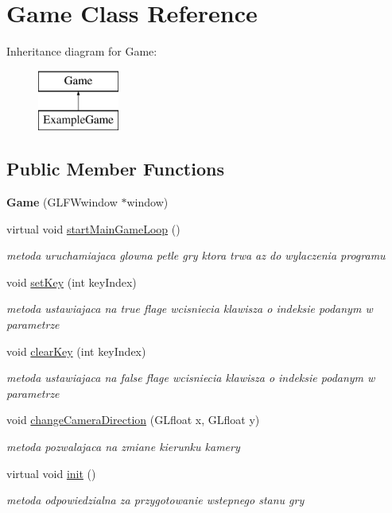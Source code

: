\hypertarget{class_game}{}\section{Game Class Reference}
\label{class_game}
Inheritance diagram for Game\+:\begin{figure}[H]
\begin{center}
\leavevmode
\includegraphics[height=2.000000cm]{class_game}
\end{center}
\end{figure}
\subsection*{Public Member Functions}
\begin{DoxyCompactItemize}
\item 
\mbox{\label{class_game_aa6ff0b765ee893dfb1aa2ad1a441b227}} 
{\bfseries Game} (G\+L\+F\+Wwindow $\ast$window)
\item 
virtual void \hyperlink{class_game_abf74d863d666bc8e1c5aa8942ba0ac18}{start\+Main\+Game\+Loop} ()
\begin{DoxyCompactList}\small\item\em metoda uruchamiajaca glowna petle gry ktora trwa az do wylaczenia programu \end{DoxyCompactList}\item 
void \hyperlink{class_game_a403da81cad9f17da729f7362768ba118}{set\+Key} (int key\+Index)
\begin{DoxyCompactList}\small\item\em metoda ustawiajaca na true flage wcisniecia klawisza o indeksie podanym w parametrze \end{DoxyCompactList}\item 
void \hyperlink{class_game_a90758cbf907d59c91ee811c45f70b654}{clear\+Key} (int key\+Index)
\begin{DoxyCompactList}\small\item\em metoda ustawiajaca na false flage wcisniecia klawisza o indeksie podanym w parametrze \end{DoxyCompactList}\item 
void \hyperlink{class_game_a62e1c1e74cccf1ecb4afe50495dfd521}{change\+Camera\+Direction} (G\+Lfloat x, G\+Lfloat y)
\begin{DoxyCompactList}\small\item\em metoda pozwalajaca na zmiane kierunku kamery \end{DoxyCompactList}\item 
virtual void \hyperlink{class_game_a6f3a33940524b6ba9d83f627ccb14bbf}{init} ()
\begin{DoxyCompactList}\small\item\em metoda odpowiedzialna za przygotowanie wstepnego stanu gry \end{DoxyCompactList}\end{DoxyCompactItemize}
